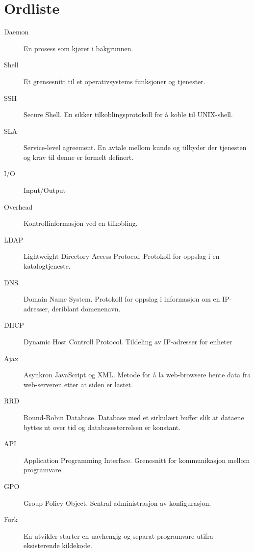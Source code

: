 \chapter*{Ordliste}
\begin{description}
	\item[Daemon] En prosess som kjører i bakgrunnen.
	\item[Shell] Et grensesnitt til et operativsystems funksjoner og tjenester.
	\item[SSH] Secure Shell. En sikker tilkoblingsprotokoll for å koble til UNIX-shell.
	\item[SLA] Service-level agreement. En avtale mellom kunde og tilbyder der tjenesten og krav til denne er formelt definert.
	\item[I/O] Input/Output
	\item[Overhead] Kontrollinformasjon ved en tilkobling.
	\item[LDAP] Lightweight Directory Access Protocol. Protokoll for oppslag i en katalogtjeneste.
	\item[DNS] Domain Name System. Protokoll for oppslag i informasjon om en IP-adresser, deriblant domenenavn.
	\item[DHCP] Dynamic Host Controll Protocol. Tildeling av IP-adresser for enheter
	\item[Ajax] Asynkron JavaScript og XML. Metode for å la web-browsere hente data fra web-serveren etter at siden er lastet.
	\item[RRD] Round-Robin Database. Database med et sirkulært buffer slik at dataene byttes ut over tid og databasestørrelsen er konstant.
	\item[API] Application Programming Interface. Grenesnitt for kommunikasjon mellom programvare.
	\item[GPO] Group Policy Object. Sentral administrasjon av konfigurasjon.
	\item[Fork] En utvikler starter en uavhengig og separat programvare utifra eksisterende kildekode.
\end{description}
